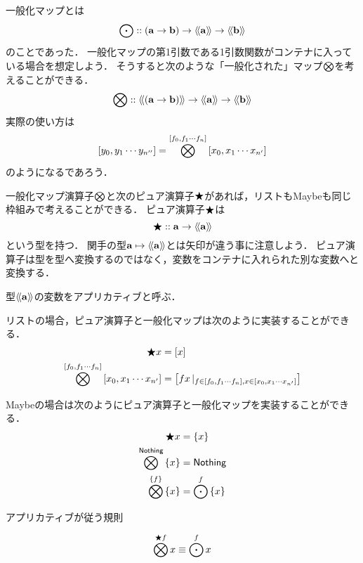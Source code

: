 \documentclass[twocolumn]{jsbook}
\newcommand{\typename}[1]{\mathbf{#1}}
\newcommand{\listtype}[1]{\left[#1\right]}
\newcommand{\guard}[1]{\mathop{\mid_{#1}}}
\begin{document}
一般化マップとは$$\mapfunc::(\typename{a}\rightarrow\typename{b})\rightarrow\generalcontainer{\typename{a}}\rightarrow\generalcontainer{\typename{b}}$$のことであった．
一般化マップの第1引数である1引数関数がコンテナに入っている場合を想定しよう．
そうすると次のような「一般化された」マップ$\bigotimes$を考えることができる．
$$\applicativefunc::\generalcontainer{(\typename{a}\rightarrow\typename{b})}\rightarrow\generalcontainer{\typename{a}}\rightarrow\generalcontainer{\typename{b}}$$
実際の使い方は$$\listtype{y_0,y_1\dotsb y_{n''}}=\applicativefunc^{\listtype{f_0,f_1\dotsb f_n}}\listtype{x_0,x_1\dotsb x_{n'}}$$のようになるであろう．

一般化マップ演算子$\bigotimes$と次のピュア演算子$\bigstar$があれば，リストもMaybeも同じ枠組みで考えることができる．
ピュア演算子$\bigstar$は$$\pure::\typename{a}\rightarrow\generalcontainer{\typename{a}}$$という型を持つ．
関手の型$\typename{a}\mapsto\generalcontainer{\typename{a}}$とは矢印が違う事に注意しよう．
ピュア演算子は型を型へ変換するのではなく，変数をコンテナに入れられた別な変数へと変換する．

型$\generalcontainer{\typename{a}}$の変数をアプリカティブと呼ぶ．

リストの場合，ピュア演算子と一般化マップは次のように実装することができる．
\begin{align*}
\pure x&=\listtype{x}\\
\applicativefunc^{\listtype{f_0,f_1\dotsb f_n}}\listtype{x_0,x_1\dotsb x_{n'}}&=\listtype{fx\guard{f\in\listtype{f_0,f_1\dotsb f_n},x\in\listtype{x_0,x_1\dotsb x_{n'}}}}
\end{align*}

Maybeの場合は次のようにピュア演算子と一般化マップを実装することができる．
\begin{align*}
\bigstar x&=\left\{x\right\}\\
\bigotimes^{\textsf{Nothing}}\left\{x\right\}&=\textsf{Nothing}\\
\bigotimes^{\left\{f\right\}}\left\{x\right\}&=\bigodot^f\left\{x\right\}
\end{align*}



アプリカティブが従う規則

$$\bigotimes^{\bigstar f}x\equiv\bigodot^fx$$
\end{document}
